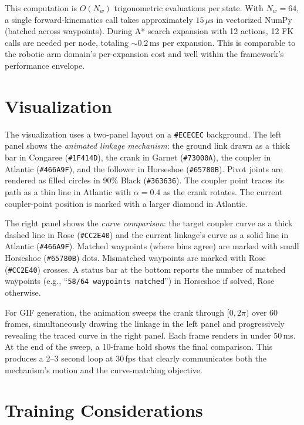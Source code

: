 \documentclass[11pt]{article}
\begin{document}
This computation is $O(N_w)$ trigonometric evaluations per state. With $N_w = 64$, a single forward-kinematics call takes approximately $15\,\mu\text{s}$ in vectorized NumPy (batched across waypoints). During A* search expansion with 12 actions, 12 FK calls are needed per node, totaling $\sim 0.2\,\text{ms}$ per expansion. This is comparable to the robotic arm domain's per-expansion cost and well within the framework's performance envelope.

\section{Visualization}

The visualization uses a two-panel layout on a \texttt{\#ECECEC} background. The left panel shows the \textit{animated linkage mechanism}: the ground link drawn as a thick bar in Congaree (\texttt{\#1F414D}), the crank in Garnet (\texttt{\#73000A}), the coupler in Atlantic (\texttt{\#466A9F}), and the follower in Horseshoe (\texttt{\#65780B}). Pivot joints are rendered as filled circles in 90\% Black (\texttt{\#363636}). The coupler point traces its path as a thin line in Atlantic with $\alpha = 0.4$ as the crank rotates. The current coupler-point position is marked with a larger diamond in Atlantic.

The right panel shows the \textit{curve comparison}: the target coupler curve as a thick dashed line in Rose (\texttt{\#CC2E40}) and the current linkage's curve as a solid line in Atlantic (\texttt{\#466A9F}). Matched waypoints (where bins agree) are marked with small Horseshoe (\texttt{\#65780B}) dots. Mismatched waypoints are marked with Rose (\texttt{\#CC2E40}) crosses. A status bar at the bottom reports the number of matched waypoints (e.g., ``\texttt{58/64 waypoints matched}'') in Horseshoe if solved, Rose otherwise.

For GIF generation, the animation sweeps the crank through $[0, 2\pi)$ over 60 frames, simultaneously drawing the linkage in the left panel and progressively revealing the traced curve in the right panel. Each frame renders in under 50\,ms. At the end of the sweep, a 10-frame hold shows the final comparison. This produces a 2--3 second loop at 30\,fps that clearly communicates both the mechanism's motion and the curve-matching objective.

\section{Training Considerations}
\end{document}

